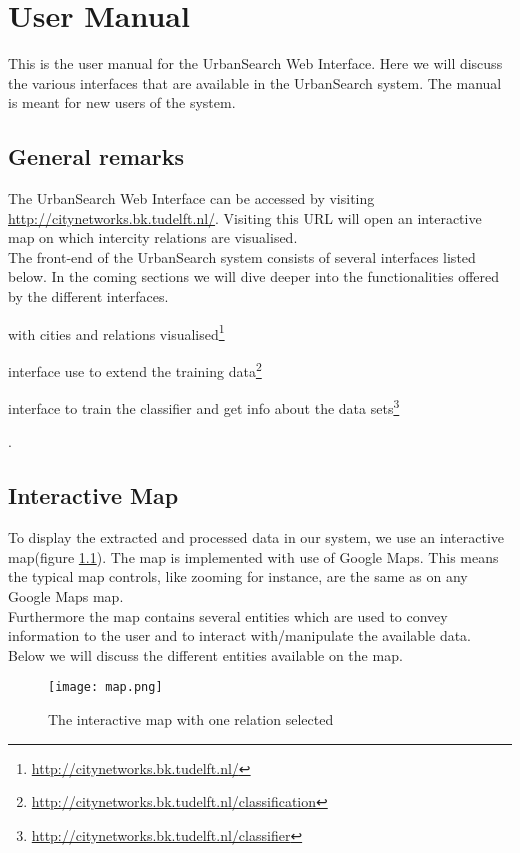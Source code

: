 \chapter{User Manual}
This is the user manual for the UrbanSearch Web Interface. Here we will discuss the various interfaces that are available in the UrbanSearch system. The manual is meant for new users of the system.

\section{General remarks}
The UrbanSearch Web Interface can be accessed by visiting \url{http://citynetworks.bk.tudelft.nl/}. Visiting this URL will open an interactive map on which intercity relations are visualised.\\
The front-end of the UrbanSearch system consists of several interfaces listed below. In the coming sections we will dive deeper into the functionalities offered by the different interfaces.

\begin{description}[align=left]
\item [Interactive Map] with cities and relations visualised\footnote{\url{http://citynetworks.bk.tudelft.nl/}}
\item [Classification] interface use to extend the training data\footnote{\url{http://citynetworks.bk.tudelft.nl/classification}}
\item [Classifier] interface to train the classifier and get info about the data sets\footnote{\url{http://citynetworks.bk.tudelft.nl/classifier}}
\end{description}. 


\section{Interactive Map}

To display the extracted and processed data in our system, we use an interactive map(figure \ref{fig:map}). The map is implemented with use of Google Maps. This means the typical map controls, like zooming for instance, are the same as on any Google Maps map.\\
Furthermore the map contains several entities which are used to convey information to the user and to interact with/manipulate the available data.\\
Below we will discuss the different entities available on the map.
\begin{figure}[H]
    \centering
    \texttt{[image: map.png]}
    \caption{The interactive map with one relation selected}
    \label{fig:map}
\end{figure}

